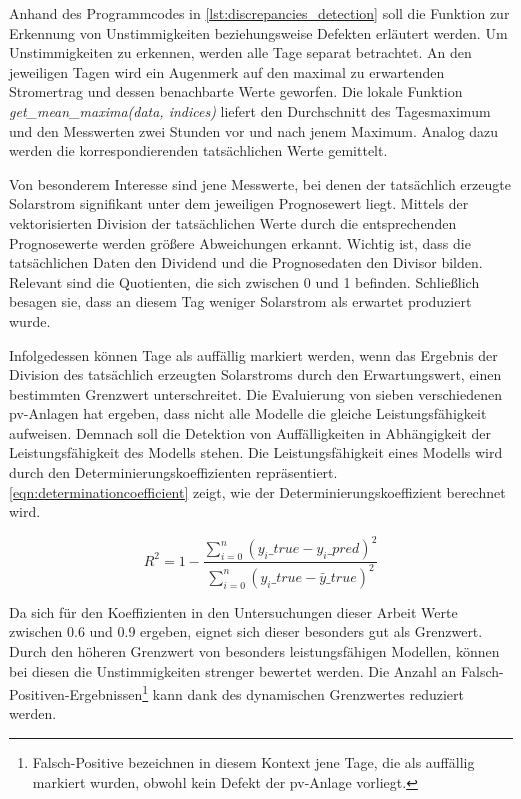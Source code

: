 \documentclass[12pt, a4paper]{article}
\begin{document}
Anhand des Programmcodes in  \autoref{lst:discrepancies_detection} soll die Funktion zur Erkennung von Unstimmigkeiten beziehungsweise Defekten erläutert werden. Um Unstimmigkeiten zu erkennen, werden alle Tage separat betrachtet. An den jeweiligen Tagen wird ein Augenmerk auf den maximal zu erwartenden Stromertrag und dessen benachbarte Werte geworfen. Die lokale Funktion \textit{get\_mean\_maxima(data, indices)} liefert den Durchschnitt des Tagesmaximum und den Messwerten zwei Stunden vor und nach jenem Maximum. Analog dazu werden die korrespondierenden tatsächlichen Werte gemittelt.

Von besonderem Interesse sind jene Messwerte, bei denen der tatsächlich erzeugte Solarstrom signifikant unter dem jeweiligen Prognosewert liegt. Mittels der vektorisierten Division der tatsächlichen Werte durch die entsprechenden Prognosewerte werden größere Abweichungen erkannt. Wichtig ist, dass die tatsächlichen Daten den Dividend und die Prognosedaten den Divisor bilden. Relevant sind die Quotienten, die sich zwischen 0 und 1 befinden. Schließlich besagen sie, dass an diesem Tag weniger Solarstrom als erwartet produziert wurde.

Infolgedessen können Tage als auffällig markiert werden, wenn das Ergebnis der Division des tatsächlich erzeugten Solarstroms durch den Erwartungswert, einen bestimmten Grenzwert unterschreitet. Die Evaluierung von sieben verschiedenen \ac{pv}-Anlagen hat ergeben, dass nicht alle Modelle die gleiche Leistungsfähigkeit aufweisen. Demnach soll die Detektion von Auffälligkeiten in Abhängigkeit der Leistungsfähigkeit des Modells stehen. Die Leistungsfähigkeit eines Modells wird durch den Determinierungskoeffizienten repräsentiert. \autoref{eqn:determinationcoefficient} zeigt, wie der Determinierungskoeffizient berechnet wird.

\begin{equation}
\label{eqn:determinationcoefficient}
R^2=1-\frac{\sum_{i=0}^n(y_i\_true-y_i\_pred)^2}{\sum_{i=0}^n(y_i\_true-\bar{y}\_true)^2}
\end{equation}


Da sich für den Koeffizienten in den Untersuchungen dieser Arbeit Werte zwischen 0.6 und 0.9 ergeben, eignet sich dieser besonders gut als Grenzwert. Durch den höheren Grenzwert von besonders leistungsfähigen Modellen, können bei diesen die Unstimmigkeiten strenger bewertet werden. Die Anzahl an Falsch-Positiven-Ergebnissen\footnote{Falsch-Positive bezeichnen in diesem Kontext jene Tage, die als auffällig markiert wurden, obwohl kein Defekt der \ac{pv}-Anlage vorliegt.} kann dank des dynamischen Grenzwertes reduziert werden.
\end{document}
